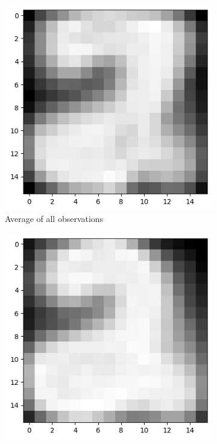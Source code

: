 \documentclass[12pt,letterpaper]{article}
\begin{document}
\begin{figure}[h]
  \centering
  \begin{subfigure}{0.3\textwidth}
    \includegraphics[width=\textwidth]{avg_img}
    \caption{Average of all observations}
  \end{subfigure}
  \begin{subfigure}{0.3\textwidth}
    \includegraphics[width=\textwidth]{avg_2}

\end{subfigure}
\end{figure}
\end{document}
